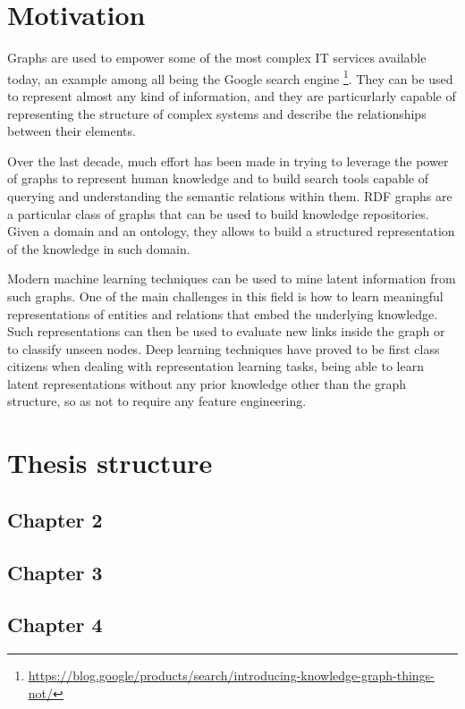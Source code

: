 \documentclass[%
    corpo=13.5pt,
    twoside,
    oldstyle,
    tipotesi=magistrale,
    greek,
    evenboxes
]{toptesi}
\begin{document}
\section{Motivation}

Graphs are used to empower some of the most complex IT services available
today, an example among all being the Google search engine
\footnote{\url{https://blog.google/products/search/introducing-knowledge-graph-things-not/}}.
They can be used to represent almost any kind of information, and they are
particurlarly capable of representing the structure of complex systems and
describe the relationships between their elements.

Over the last decade, much effort has been made in trying to leverage the power
of graphs to represent human knowledge and to build search tools capable of
querying and understanding the semantic relations within them. RDF graphs are a
particular class of graphs that can be used to build knowledge
repositories. Given a domain and an ontology, they allows to build a structured
representation of the knowledge in such domain.

Modern machine learning techniques can be used to mine latent information
from such graphs. One of the main challenges in this field is how to learn
meaningful representations of entities and relations that embed
the underlying knowledge. Such representations can then be used to evaluate
new links inside the graph or to classify unseen nodes.
Deep learning techniques have proved to be first class citizens when
dealing with representation learning tasks, being able to learn latent
representations without any prior knowledge other than the graph structure,
so as not to require any feature engineering.



\section{Thesis structure}

\subsection{Chapter 2}

\subsection{Chapter 3}

\subsection{Chapter 4}
\end{document}

